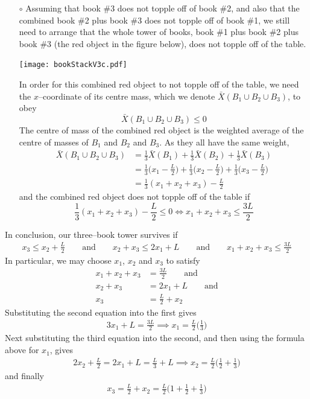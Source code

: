 \begin{itemize}
\begin{itemize}
\item[$\circ$]
Assuming that book \#3 does not topple off of book \#2, and also
that the combined book \#2 plus book \#3 does not topple off of book \#1,
we still need to arrange that the whole tower of books, book \#1 plus
book \#2 plus book \#3 (the red object in the figure below), does not
topple off of the table.
\begin{efig}
\begin{center}
     \texttt{[image: bookStackV3c.pdf]}
\end{center}
\end{efig}
In order for this combined red object to not topple off of the table,
we need the $x$--coordinate of its centre mass, which we denote
$\bar X(B_1\cup B_2\cup B_3)$, to obey
\begin{equation*}
\bar X(B_1\cup B_2\cup B_3) \le 0
\end{equation*}
The centre of mass of the combined red object is the weighted
average  of the centre of masses of $B_1$ and $B_2$ and $B_3$.
As they all have the same weight,
\begin{align*}
\bar X(B_1\cup B_2\cup B_3) &= \frac{1}{3}\bar X(B_1) +\frac{1}{3}\bar X(B_2)
                                +\frac{1}{3}\bar X(B_3) \\
  &=  \frac{1}{3}\Big(x_1-\frac{L}{2}\Big)
     +\frac{1}{3}\Big(x_2-\frac{L}{2}\Big)
     +\frac{1}{3}\Big(x_3-\frac{L}{2}\Big) \\
&= \frac{1}{3}(x_1+x_2+x_3) -\frac{L}{2}
\end{align*}
and the combined red object does not topple off of the table if
\begin{equation*}
\frac{1}{3}(x_1+ x_2+x_3) -\frac{L}{2} \le 0
\iff
x_1+ x_2+x_3\le \frac{3L}{2}
\end{equation*}
\end{itemize}
In conclusion, our three--book tower survives if
\begin{align*}
x_3\le x_2+\frac{L}{2}\qquad\text{and}\qquad x_2+x_3\le 2x_1 + L
\qquad\text{and}\qquad x_1+ x_2+x_3\le \frac{3L}{2}
\end{align*}
In particular, we may choose $x_1$, $x_2$ and $x_3$ to satisfy
\begin{align*}
x_1+ x_2+x_3&= \frac{3L}{2}\qquad\text{and} \\
x_2+x_3&= 2x_1 + L \qquad\text{and} \\
x_3 &= \frac{L}{2} + x_2
\end{align*}
Substituting the second equation into the first gives
\begin{align*}
3x_1 +L = \frac{3L}{2}
\implies x_1 = \frac{L}{2}\Big(\frac{1}{3}\Big)
\end{align*}
Next substituting the third equation into the second, and then
using the formula above for $x_1$, gives
\begin{align*}
2x_2 +\frac{L}{2} = 2x_1+L = \frac{L}{3} + L
\implies x_2 = \frac{L}{2}\Big(\frac{1}{2}+\frac{1}{3}\Big)
\end{align*}
and finally
\begin{align*}
     x_3 = \frac{L}{2} + x_2
         = \frac{L}{2}\Big(1+\frac{1}{2}+\frac{1}{3}\Big)
\end{align*}



\end{itemize}
